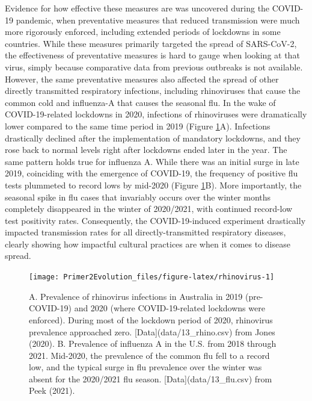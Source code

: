 \documentclass[
]{book}
\begin{document}
Evidence for how effective these measures are was uncovered during the COVID-19 pandemic, when preventative measures that reduced transmission were much more rigorously enforced, including extended periods of lockdowns in some countries. While these measures primarily targeted the spread of SARS-CoV-2, the effectiveness of preventative measures is hard to gauge when looking at that virus, simply because comparative data from previous outbreaks is not available. However, the same preventative measures also affected the spread of other directly transmitted respiratory infections, including rhinoviruses that cause the common cold and influenza-A that causes the seasonal flu. In the wake of COVID-19-related lockdowns in 2020, infections of rhinoviruses were dramatically lower compared to the same time period in 2019 (Figure \ref{fig:rhinovirus}A). Infections drastically declined after the implementation of mandatory lockdowns, and they rose back to normal levels right after lockdowns ended later in the year. The same pattern holds true for influenza A. While there was an initial surge in late 2019, coinciding with the emergence of COVID-19, the frequency of positive flu tests plummeted to record lows by mid-2020 (Figure \ref{fig:rhinovirus}B). More importantly, the seasonal spike in flu cases that invariably occurs over the winter months completely disappeared in the winter of 2020/2021, with continued record-low test positivity rates. Consequently, the COVID-19-induced experiment drastically impacted transmission rates for all directly-transmitted respiratory diseases, clearly showing how impactful cultural practices are when it comes to disease spread.

\begin{figure}
\texttt{[image: Primer2Evolution\_files/figure-latex/rhinovirus-1]} \caption{A. Prevalence of rhinovirus infections in Australia in 2019 (pre-COVID-19) and 2020 (where COVID-19-related lockdowns were enforced). During most of the lockdown period of 2020, rhinovirus prevalence approached zero.  [Data](data/13_rhino.csv) from Jones (2020). B. Prevalence of influenza A in the U.S. from 2018 through 2021. Mid-2020, the prevalence of the common flu fell to a record low, and the typical surge in flu prevalence over the winter was absent for the 2020/2021 flu season. [Data](data/13_flu.csv) from Peek (2021).}\label{fig:rhinovirus}
\end{figure}
\end{document}
